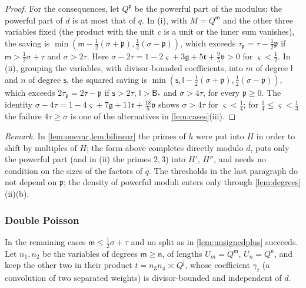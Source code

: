 \documentclass[11pt,colorlinks]{charlie}
\begin{document}
\begin{proof}
For the consequences, let $Q^{\mathfrak p}$ be the powerful part of the modulus; the powerful part of $d$ is at most that of $q$. In (i), with $M=Q^{\mathsf m}$ and the other three variables fixed (the product with the unit $c$ is a unit or the inner sum vanishes), the saving is $\min(\mathsf m-\frac12(\sigma+\mathfrak p),\frac12(\sigma-\mathfrak p))$, which exceeds $\tau_{\mathfrak p}=\tau-\frac12\mathfrak p$ if $\mathsf m>\frac12\sigma+\tau$ and $\sigma>2\tau$. Here $\sigma-2\tau=1-2\varsigma+3\mathfrak g+5\mathfrak r+\frac95\mathfrak v>0$ for $\varsigma<\frac12$. In (ii), grouping the variables, with divisor-bounded coefficients, into $m$ of degree $\mathsf l$ and $n$ of degree $\mathsf s$, the squared saving is $\min(\mathsf s,\mathsf l-\frac12(\sigma+\mathfrak p),\frac12(\sigma-\mathfrak p))$, which exceeds $2\tau_{\mathfrak p}=2\tau-\mathfrak p$ if $\mathsf s>2\tau$, $\mathsf l>\mathsf B_*$ and $\sigma>4\tau$, for every $\mathfrak p\ge0$. The identity $\sigma-4\tau=1-4\varsigma+7\mathfrak g+11\mathfrak r+\frac{18}5\mathfrak v$ shows $\sigma>4\tau$ for $\varsigma<\frac14$; for $\frac14\le\varsigma<\frac13$ the failure $4\tau\ge\sigma$ is one of the alternatives in \cref{lem:cases}(iii).
\end{proof}

\emph{Remark.} In \cref{lem:onevar,lem:bilinear} the primes of $h$ were put into $H$ in order to shift by multiples of $H$; the form above completes directly modulo $d$, puts only the powerful part (and in (ii) the primes $2,3$) into $H'$, $H''$, and needs no condition on the sizes of the factors of $q$. The thresholds in the last paragraph do not depend on $\mathfrak p$; the density of powerful moduli enters only through \cref{lem:degrees}(ii)(b).

\subsubsection*{Double Poisson}

In the remaining cases $\mathsf m\le\frac12\sigma+\tau$ and no split as in \cref{lem:unsignedplus} succeeds. Let $n_1,n_2$ be the variables of degrees $\mathsf m\ge\mathsf n$, of lengths $U_m=Q^{\mathsf m}$, $U_n=Q^{\mathsf n}$, and keep the other two in their product $t=n_3n_4\asymp Q^{\mathsf j}$, whose coefficient $\gamma_t$ (a convolution of two separated weights) is divisor-bounded and independent of $d$.
\end{document}
